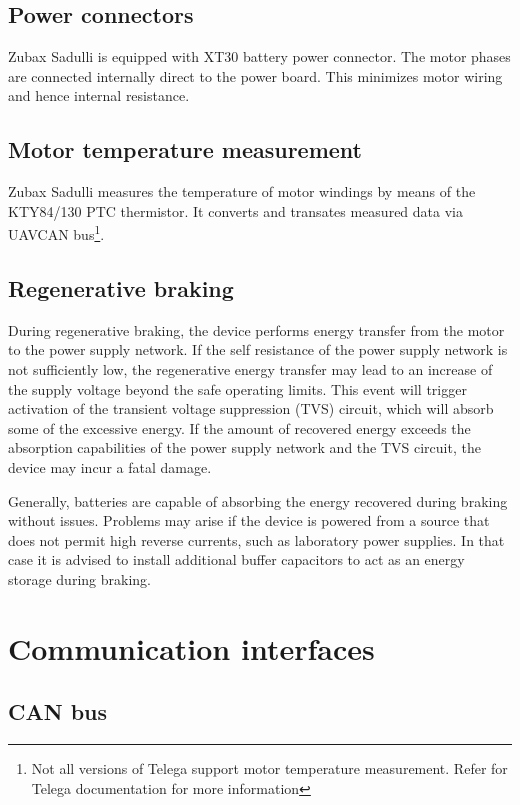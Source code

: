 \documentclass{zubaxdoc}
\begin{document}
\subsection{Power connectors}

Zubax Sadulli is equipped with XT30 battery power connector. 
The motor phases are connected internally direct to the power board. This minimizes motor wiring and hence internal resistance. 

\subsection{Motor temperature measurement}

Zubax Sadulli measures the temperature of motor windings by means of the KTY84/130 PTC thermistor. It converts and transates measured data via UAVCAN bus\footnote{Not all versions of Telega support motor temperature measurement. Refer for Telega documentation for more information}.  

\subsection{Regenerative braking}

During regenerative braking, the device performs energy transfer from the motor to the power supply network.
If the self resistance of the power supply network is not sufficiently low,
the regenerative energy transfer may lead to an increase of the supply voltage beyond
the safe operating limits.
This event will trigger activation of the transient voltage suppression (TVS) circuit,
which will absorb some of the excessive energy.
If the amount of recovered energy exceeds the absorption capabilities of the power supply
network and the TVS circuit, the device may incur a fatal damage.

Generally, batteries are capable of absorbing the energy recovered during braking without issues.
Problems may arise if the device is powered from a source that does not permit high reverse currents,
such as laboratory power supplies.
In that case it is advised to install additional buffer capacitors to act as an energy storage
during braking.

\section{Communication interfaces}

\subsection{CAN bus}
\end{document}
